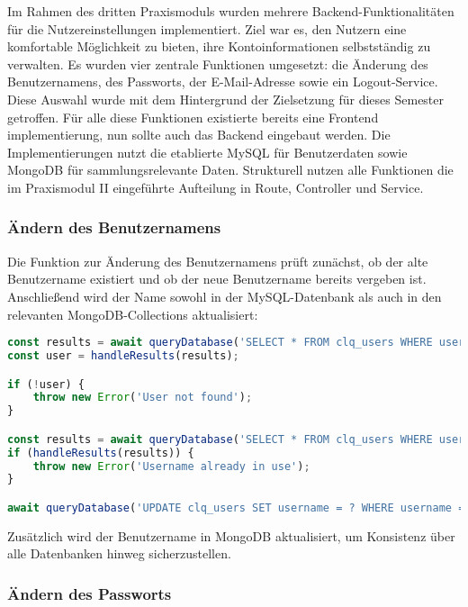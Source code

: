 Im Rahmen des dritten Praxismoduls wurden mehrere Backend-Funktionalitäten für die Nutzereinstellungen implementiert.
Ziel war es, den Nutzern eine komfortable Möglichkeit zu bieten, ihre Kontoinformationen selbstständig zu verwalten.
Es wurden vier zentrale Funktionen umgesetzt: die Änderung des Benutzernamens, des Passworts, der E-Mail-Adresse sowie ein Logout-Service.
Diese Auswahl wurde mit dem Hintergrund der Zielsetzung für dieses Semester getroffen.
Für alle diese Funktionen existierte bereits eine Frontend implementierung, nun sollte auch das Backend eingebaut werden.
Die Implementierungen nutzt die etablierte MySQL für Benutzerdaten sowie MongoDB für sammlungsrelevante Daten.
Strukturell nutzen alle Funktionen die im Praxismodul II eingeführte Aufteilung in Route, Controller und Service.

\subsubsection{Ändern des Benutzernamens}\label{subsubsec:username-update}

Die Funktion zur Änderung des Benutzernamens prüft zunächst, ob der alte Benutzername existiert und ob der neue Benutzername bereits vergeben ist.
Anschließend wird der Name sowohl in der MySQL-Datenbank als auch in den relevanten MongoDB-Collections aktualisiert:

\begin{lstlisting}[language=JavaScript, caption=Überprüfung und Update des Usernamens in MySQL]
const results = await queryDatabase('SELECT * FROM clq_users WHERE username = ?', [oldUsername]);
const user = handleResults(results);

if (!user) {
    throw new Error('User not found');
}

const results = await queryDatabase('SELECT * FROM clq_users WHERE username = ?', [newUsername]);
if (handleResults(results)) {
    throw new Error('Username already in use');
}

await queryDatabase('UPDATE clq_users SET username = ? WHERE username = ?', [newUsername, oldUsername]);
\end{lstlisting}

Zusätzlich wird der Benutzername in MongoDB aktualisiert, um Konsistenz über alle Datenbanken hinweg sicherzustellen.

\subsubsection{Ändern des Passworts}\label{subsubsec:password-update}

